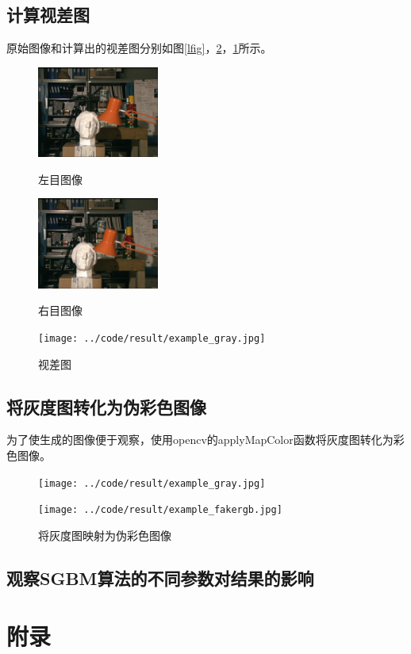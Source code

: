 \documentclass[]{article}
\begin{document}
    \subsection{计算视差图}
        原始图像和计算出的视差图分别如图\ref{lfig}，\ref{rfig}，\ref{disfig}所示。
        \begin{figure}[htbp]
            \centering
            \begin{minipage}[t]{0.3\textwidth}
                \centering
                \includegraphics[width=4cm]{../code/dataset/l.png}
                \caption{左目图像}
                \label{lfig}
            \end{minipage}
            \begin{minipage}[t]{0.3\textwidth}
                \centering
                \includegraphics[width=4cm]{../code/dataset/r.png}
                \caption{右目图像}
                \label{rfig}
            \end{minipage}
            \begin{minipage}[t]{0.3\textwidth}
                \centering
                \texttt{[image: ../code/result/example\_gray.jpg]}
                \caption{视差图}
                \label{disfig}
            \end{minipage}
        \end{figure}

    \subsection{将灰度图转化为伪彩色图像}
    为了使生成的图像便于观察，使用opencv的applyMapColor函数将灰度图转化为彩色图像。

    \begin{figure}[htbp]
        \centering
        \begin{minipage}[t]{0.4\textwidth}
            \centering
            \texttt{[image: ../code/result/example\_gray.jpg]}
            \label{lfig}
        \end{minipage}
        \begin{minipage}[t]{0.4\textwidth}
            \centering
            \texttt{[image: ../code/result/example\_fakergb.jpg]}
            \label{rfig}
        \end{minipage}
        \caption{将灰度图映射为伪彩色图像}
    \end{figure}

    
    \subsection{观察SGBM算法的不同参数对结果的影响}

    \section{附录}
        

    
\end{document}
